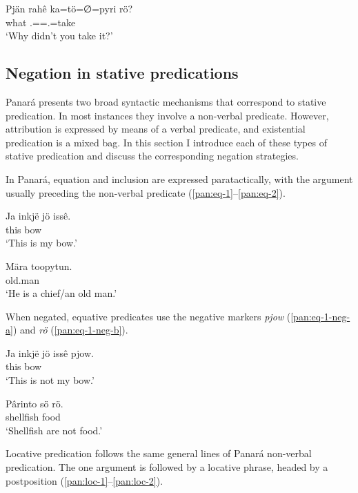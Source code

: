 \documentclass[output=paper,colorlinks,citecolor=brown,draft]{langscibook}
\begin{document}
\ea\label{pan:q-neg3}
    \gll Pjän rahê ka=tö=∅=pyri rö? \\
    what \Caus{} \Ssg.\Erg{}=\Emph{}=\Tsg.\Abs{}=take \Neg{}  \\
    \glt `Why didn't you take it?' \\
\z

\subsection{Negation in stative predications}\label{pan:sec:stative}

Panará presents two broad syntactic mechanisms that correspond to stative predication. In most instances they involve a non-verbal predicate. However, attribution is expressed by means of a verbal predicate, and existential predication is a mixed bag. In this section I introduce each of these types of stative predication and discuss the corresponding negation strategies.

In Panará, {equation} and inclusion are expressed paratactically, with the argument usually preceding the non-verbal predicate (\ref{pan:eq-1}--\ref{pan:eq-2}).

\ea\label{pan:eq-1}
    \gll Ja inkjë jö issê. \\
    this \Fsg{} \Poss{} bow \\
    \glt `This is my bow.' \\
\z

\ea\label{pan:eq-2}
    \gll Mära toopytun. \\
    \Tsg{}  old.man \\
    \glt `He is a chief/an old man.' \\
\z

When negated, equative predicates use the negative markers \textit{pjow} (\ref{pan:eq-1-neg-a}) and \textit{rö} (\ref{pan:eq-1-neg-b}).

\ea\label{pan:eq-1-neg-a}
    \gll Ja inkjë jö issê pjow. \\
    this \Fsg{} \Poss{} bow \Neg{} \\
    \glt `This is not my bow.' \\
\z

\ea\label{pan:eq-1-neg-b}
    \gll Pârinto sö rö. \\
    shellfish food \Neg{} \\
    \glt `Shellfish are not food.' \\
\z

Locative predication follows the same general lines of Panará non-verbal predication. The one argument is followed by a locative phrase, headed by a postposition (\ref{pan:loc-1}--\ref{pan:loc-2}).
\end{document}

